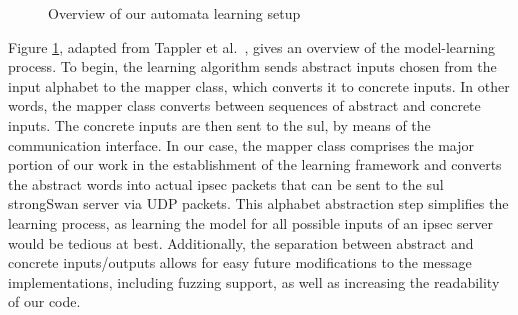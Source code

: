 \begin{figure}[h]
	\caption{Overview of our automata learning setup}
	\label{fig:AALSetup}
\end{figure}

Figure \ref{fig:AALSetup}, adapted from Tappler et al.~\cite{tappler2017}, gives an overview of the model-learning process. To begin, the learning algorithm sends abstract inputs chosen from the input alphabet to the mapper class, which converts it to concrete inputs. In other words, the mapper class converts between sequences of abstract and concrete inputs. The concrete inputs are then sent to the \ac{sul}, by means of the communication interface. In our case, the mapper class comprises the major portion of our work in the establishment of the learning framework and converts the abstract words into actual \ac{ipsec} packets that can be sent to the \ac{sul} strongSwan server via UDP packets. This alphabet abstraction step simplifies the learning process, as learning the model for all possible inputs of an \ac{ipsec} server would be tedious at best. Additionally, the separation between abstract and concrete inputs/outputs allows for easy future modifications to the message implementations, including fuzzing support, as well as increasing the readability of our code. \\

